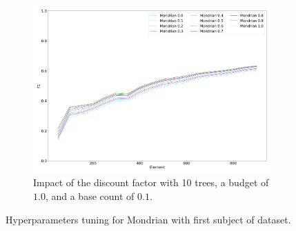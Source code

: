 \begin{figure}
\begin{subfigure}[b]{0.49\textwidth}
		 \label{fig:mondrian-budget}
	 \end{subfigure}
	 \hfill
	 \begin{subfigure}[b]{0.49\textwidth}
		 \centering
		 \includegraphics[width=\textwidth]{figures/calibration_mondrian_discount.png}
		 \caption{Impact of the discount factor with 10 trees, a budget of $1.0$, and a base count of $0.1$. }
		 \label{fig:mondrian-discount}
	 \end{subfigure}
		\caption{Hyperparameters tuning for Mondrian with first subject of \banosdataset dataset.}
		\label{fig:mondrian-tuning}
\end{figure}


